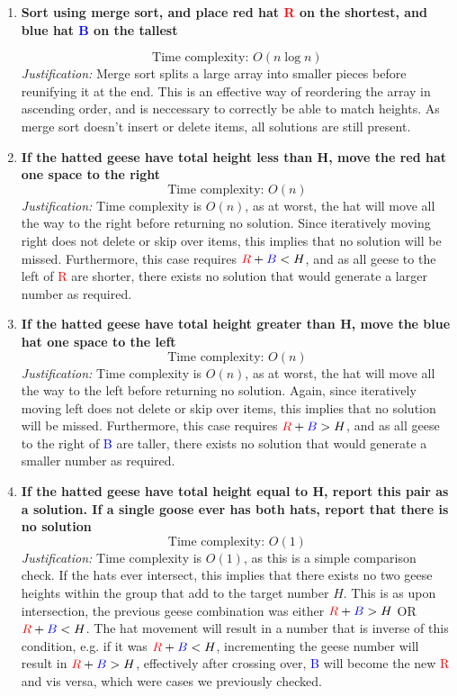 \documentclass[12pt]{article}
\begin{document}
\begin{enumerate}
    \item \textbf{Sort using merge sort, and place red hat \textcolor{red}{R} on the shortest, and blue hat \textcolor{blue}{B} on the tallest}
    
    \[
    \text{Time complexity: }O(n \log n)
    \]
    \emph{Justification:} 
    Merge sort splits a large array into smaller pieces before reunifying it at the end. This is an effective way of reordering the array in ascending order, and is neccessary to correctly be able to match heights. As merge sort doesn't insert or delete items, all solutions are still present.
    
    \item \textbf{If the hatted geese have total height less than H, move the red hat one space to the right}
    \[
    \text{Time complexity: }O(n)
    \]
    \emph{Justification:} Time complexity is $O(n)$, as at worst, the hat will move all the way to the right before returning no solution. Since iteratively moving right does not delete or skip over items, this implies that no solution will be missed. Furthermore, this case requires $\textcolor{red}{R} + \textcolor{blue}{B} < H$, and as all geese to the left of \textcolor{red}{R} are shorter, there exists no solution that would generate a larger number as required.
    
    \item \textbf{If the hatted geese have total height greater than H, move the blue hat one space to the left}
    \[
    \text{Time complexity: }O(n)
    \]
    \emph{Justification:} Time complexity is $O(n)$, as at worst, the hat will move all the way to the left before returning no solution. Again, since iteratively moving left does not delete or skip over items, this implies that no solution will be missed. Furthermore, this case requires $\textcolor{red}{R} + \textcolor{blue}{B} > H$, and as all geese to the right of \textcolor{blue}{B} are taller, there exists no solution that would generate a smaller number as required.
    
    \item \textbf{If the hatted geese have total height equal to H, report this pair as a solution. If a single goose ever has both hats, report that there is no solution}
    \[
    \text{Time complexity: }O(1)
    \]
    \emph{Justification:} Time complexity is $O(1)$, as this is a simple comparison check. If the hats ever intersect, this implies that there exists no two geese heights within the group that add to the target number $H$. This is as upon intersection, the previous geese combination was either $\textcolor{red}{R} + \textcolor{blue}{B} > H$ OR $\textcolor{red}{R} + \textcolor{blue}{B} < H$. The hat movement will result in a number that is inverse of this condition, e.g. if it was $\textcolor{red}{R} + \textcolor{blue}{B} < H$, incrementing the geese number will result in $\textcolor{red}{R} + \textcolor{blue}{B} > H$, effectively after crossing over, \textcolor{blue}{B} will become the new \textcolor{red}{R} and vis versa, which were cases we previously checked.
    

\end{enumerate}
\end{document}
